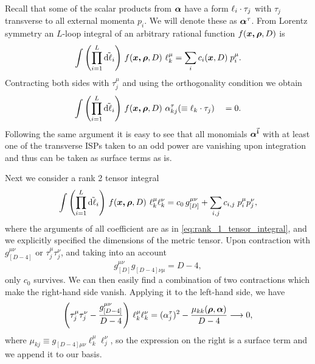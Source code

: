 
Recall that some of the scalar products from $\vb*{\alpha}$ have a form $\sp(\ell_i,\tau_j)$ with $\tau_j$ transverse to all external momenta $p_i$.
We will denote these as $\vb*{\alpha}^\tau$.
From Lorentz symmetry an $L$-loop integral of an arbitrary rational function $f(\vb*{\vb*{x},\vb*{\rho}},D)$ is
\begin{equation} \label{eq:rank_1_tensor_integral}
  \int \qty(\prod_{i=1}^{L} \tilde{\dd{\ell_i}}){}~ f(\vb*{\vb*{x},\vb*{\rho}},D) ~ \ell_k^{\mu} = \sum_{i}^{}c_i(\vb*{x},D)\;p^\mu_i.
\end{equation}
Contracting both sides with $\tau^\mu_j$ and using the orthogonality condition we obtain
\begin{equation}
  \Dmeasure{}~ f(\vb*{\vb*{x},\vb*{\rho}},D) ~ \alpha^{\tau}_{k j}( \equiv \sp(\ell_k,\tau_j)) \quad = 0.
\end{equation}
Following the same argument it is easy to see that all monomials $\vb*{\alpha}^{\va{i}}$ with at least
one of the transverse ISPs taken to an odd power are vanishing upon integration and thus can be taken as surface terms as is.

Next we consider a rank 2 tensor integral
\begin{equation}
  \int \qty(\prod_{i=1}^{L} \tilde{\dd{\ell_i}}){}~ f(\vb*{\vb*{x},\vb*{\rho}},D) ~ \ell_k^{\mu}\ell_k^{\nu} = c_0\,g^{\mu\nu}_{[D]} + \sum_{i,j}^{}c_{i,j}\;p^\mu_i p^\nu_j,
\end{equation}
where the arguments of all coefficient are as in \cref{eq:rank_1_tensor_integral}, and we explicitly specified the dimensions of the metric tensor.
Upon contraction with $g^{\mu\nu}_{[D-4]}$ or $\tau_j^\mu\tau_j^\nu$, and taking into an account
\[
  g^{\mu\nu}_{[D]}g^{\phantom{\mu\nu}}_{[D-4]\nu\mu} = D-4,
\]
only $c_0$ survives.
We can then easily find a combination of two contractions which make the right-hand side vanish. Applying it to the left-hand side, we have
\begin{equation}
  \qty(\tau_j^\mu\tau_j^\nu - \frac{g^{\mu\nu}_{[D-4]}}{D-4}) ~ \ell_k^{\mu}\ell_k^{\nu} = (\alpha_j^\tau)^2 - \frac{\mu_{kk}(\vb*{\rho},\vb*{\alpha})}{D-4} \longrightarrow 0,
\end{equation}
where $\mu_{kj} \equiv g^{\phantom{\mu\nu}}_{[D-4]\mu\nu} \ell_k^\mu \ell_j^\nu$, so the expression on the right is a surface term and
we append it to our basis.


